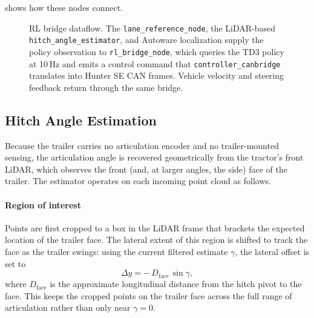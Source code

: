  shows how these nodes connect.

\begin{figure}[t]
  \centering
  \resizebox{\textwidth}{!}{}
  \caption{RL bridge dataflow. The \texttt{lane\_reference\_node}, the LiDAR-based \texttt{hitch\_angle\_estimator}, and Autoware localization supply the policy observation to \texttt{rl\_bridge\_node}, which queries the TD3 policy at 10\,Hz and emits a control command that \texttt{controller\_canbridge} translates into Hunter SE CAN frames. Vehicle velocity and steering feedback return through the same bridge.}
  \label{fig:rl_bridge}
\end{figure}

\subsection{Hitch Angle Estimation}
\label{sec:hitch_estimation}

Because the trailer carries no articulation encoder and no trailer-mounted sensing, the articulation angle is recovered geometrically from the tractor's front LiDAR, which observes the front (and, at larger angles, the side) face of the trailer. The estimator operates on each incoming point cloud as follows.

\paragraph{Region of interest} Points are first cropped to a box in the LiDAR frame that brackets the expected location of the trailer face. The lateral extent of this region is shifted to track the face as the trailer swings: using the current filtered estimate $\gamma$, the lateral offset is set to
\begin{equation}
    \Delta y = -\,D_\text{face}\,\sin\gamma,
    \label{eq:hitch_roi_shift}
\end{equation}
where $D_\text{face}$ is the approximate longitudinal distance from the hitch pivot to the face. This keeps the cropped points on the trailer face across the full range of articulation rather than only near $\gamma = 0$.

